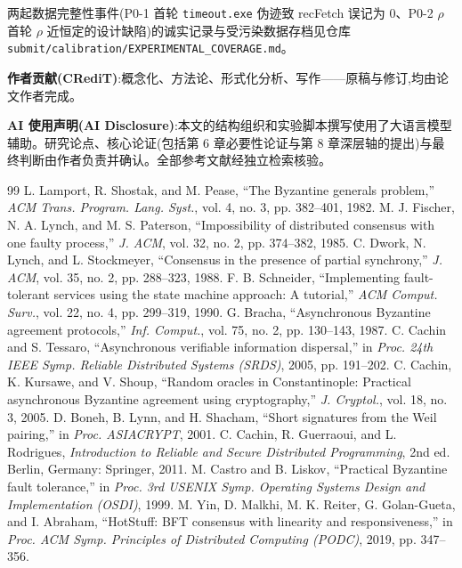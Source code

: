 \documentclass[UTF8,fontset=windows,a4paper,11pt]{ctexart}
\begin{document}
两起数据完整性事件(P0-1 首轮
\texttt{timeout.exe} 伪迹致 recFetch 误记为 0、P0-2 $\rho$ 首轮 $\rho$
近恒定的设计缺陷)的诚实记录与受污染数据存档见仓库
\texttt{submit/\allowbreak{}calibration/\allowbreak{}EXPERIMENTAL\_\allowbreak{}COVERAGE.md}。

\textbf{作者贡献(CRediT)}:概念化、方法论、形式化分析、写作------原稿与修订,均由论文作者完成。

\textbf{AI 使用声明(AI
Disclosure)}:本文的结构组织和实验脚本撰写使用了大语言模型辅助。研究论点、核心论证(包括第 6 章必要性论证与第 8
章深层轴的提出)与最终判断由作者负责并确认。全部参考文献经独立检索核验。

\begin{thebibliography}{99}
\setlength{\itemsep}{2pt plus 1pt}
 L. Lamport, R. Shostak, and M. Pease, “The Byzantine generals problem,” \textit{ACM Trans. Program. Lang. Syst.}, vol. 4, no. 3, pp. 382–401, 1982.
 M. J. Fischer, N. A. Lynch, and M. S. Paterson, “Impossibility of distributed consensus with one faulty process,” \textit{J. ACM}, vol. 32, no. 2, pp. 374–382, 1985.
 C. Dwork, N. Lynch, and L. Stockmeyer, “Consensus in the presence of partial synchrony,” \textit{J. ACM}, vol. 35, no. 2, pp. 288–323, 1988.
 F. B. Schneider, “Implementing fault-tolerant services using the state machine approach: A tutorial,” \textit{ACM Comput. Surv.}, vol. 22, no. 4, pp. 299–319, 1990.
 G. Bracha, “Asynchronous Byzantine agreement protocols,” \textit{Inf. Comput.}, vol. 75, no. 2, pp. 130–143, 1987.
 C. Cachin and S. Tessaro, “Asynchronous verifiable information dispersal,” in \textit{Proc. 24th IEEE Symp. Reliable Distributed Systems (SRDS)}, 2005, pp. 191–202.
 C. Cachin, K. Kursawe, and V. Shoup, “Random oracles in Constantinople: Practical asynchronous Byzantine agreement using cryptography,” \textit{J. Cryptol.}, vol. 18, no. 3, 2005.
 D. Boneh, B. Lynn, and H. Shacham, “Short signatures from the Weil pairing,” in \textit{Proc. ASIACRYPT}, 2001.
 C. Cachin, R. Guerraoui, and L. Rodrigues, \textit{Introduction to Reliable and Secure Distributed Programming}, 2nd ed. Berlin, Germany: Springer, 2011.
 M. Castro and B. Liskov, “Practical Byzantine fault tolerance,” in \textit{Proc. 3rd USENIX Symp. Operating Systems Design and Implementation (OSDI)}, 1999.
 M. Yin, D. Malkhi, M. K. Reiter, G. Golan-Gueta, and I. Abraham, “HotStuff: BFT consensus with linearity and responsiveness,” in \textit{Proc. ACM Symp. Principles of Distributed Computing (PODC)}, 2019, pp. 347–356.

\end{thebibliography}
\end{document}
